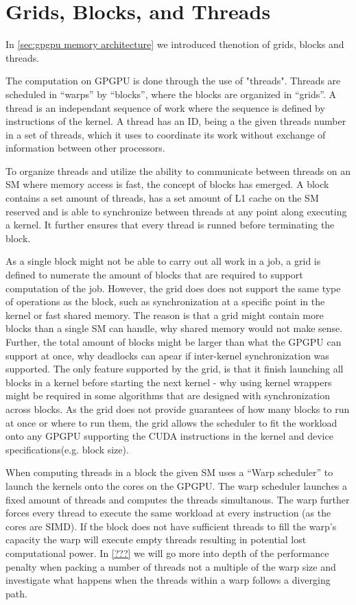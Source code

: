 \section{Grids, Blocks, and Threads}
\label{sec:grids blocks threads}

In \cref{sec:gpgpu memory architecture} we introduced thenotion of grids, blocks and threads.


The computation on GPGPU is done through the use of "threads".
Threads are scheduled in ``warps'' by ``blocks'', where the blocks are organized in ``grids''.
A thread is an independant sequence of work where the sequence is defined by instructions of the kernel.
A thread has an ID, being a the given threads number in a set of threads, which it uses to coordinate its work without exchange of information between other processors.

To organize threads and utilize the ability to communicate between threads on an SM where memory access is fast, the concept of blocks has emerged.
A block contains a set amount of threads, has a set amount of L1 cache on the SM reserved and is able to synchronize between threads at any point along executing a kernel.
It further ensures that every thread is runned before terminating the block.

As a single block might not be able to carry out all work in a job, a grid is defined to numerate the amount of blocks that are required to support computation of the job.
However, the grid does does not support the same type of operations as the block, such as synchronization at a specific point in the kernel or fast shared memory.
The reason is that a grid might contain more blocks than a single SM can handle, why shared memory would not make sense.
Further, the total amount of blocks might be larger than what the GPGPU can support at once, why deadlocks can apear if inter-kernel synchronization was supported.
The only feature supported by the grid, is that it finish launching all blocks in a kernel before starting the next kernel - why using kernel wrappers might be required in some algorithms that are designed with synchronization across blocks.
As the grid does not provide guarantees of how many blocks to run at once or where to run them, the grid allows the scheduler to fit the workload onto any GPGPU supporting the CUDA instructions in the kernel and device specifications(e.g. block size).

When computing threads in a block the given SM uses a ``Warp scheduler'' to launch the kernels onto the cores on the GPGPU.
The warp scheduler launches a fixed amount of threads and computes the threads simultanous. 
The warp further forces every thread to execute the same workload at every instruction (as the cores are SIMD).
If the block does not have sufficient threads to fill the warp's capacity the warp will execute empty threads resulting in potential lost computational power.
In \cref{???} we will go more into depth of the performance penalty when packing a number of threads not a multiple of the warp size and investigate what happens when the threads within a warp follows a diverging path.

